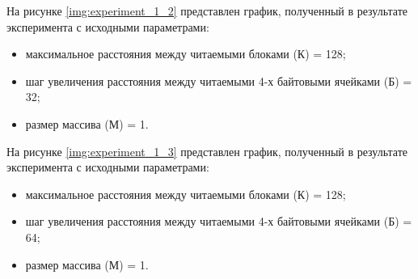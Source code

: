 На рисунке \ref{img:experiment_1_2} представлен график, полученный в результате эксперимента с исходными параметрами:
\begin{itemize}
	\item максимальное расстояния между	читаемыми блоками (К) = 128;
	\item шаг увеличения расстояния между читаемыми 4-х байтовыми ячейками (Б) = 32;
	\item размер массива (М) = 1.
\end{itemize}

\begin{figure}[H]
\end{figure}

На рисунке \ref{img:experiment_1_3} представлен график, полученный в результате эксперимента с исходными параметрами:
\begin{itemize}
	\item максимальное расстояния между	читаемыми блоками (К) = 128;
	\item шаг увеличения расстояния между читаемыми 4-х байтовыми ячейками (Б) = 64;
	\item размер массива (М) = 1.
\end{itemize}

\begin{figure}[H]
\end{figure}

